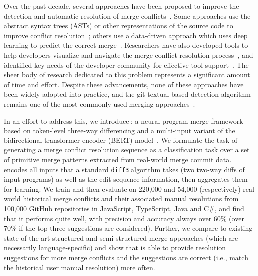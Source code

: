 Over the past decade, several approaches have been proposed to improve the detection and automatic resolution of merge conflicts~\cite{mens2002state,apel2010semistructured,lessenich2017renaming,sousa2018verified,cavalcanti2017evaluating,zhu2018conflict,kasi2013cassandra,brun2011proactive}. Some approaches use the abstract syntax trees (ASTs) or other representations of the source code to improve conflict resolution~\cite{westfechtel1991structure,apel2010semistructured, tavares2019semistructured}; others use a data-driven approach which uses deep learning to predict the correct merge~\cite{Dinella2021}. Researchers have also developed tools to help developers visualize and navigate the merge conflict resolution process~\cite{shen2019intellimerge,semanticmerge,beyondcompare}, and identified key needs of the developer community for effective tool support~\cite{nelson2019life}. The sheer body of research dedicated to this problem represents a significant amount of time and effort. Despite these advancements, none of these approaches have been widely adopted into practice, and the git textual-based detection algorithm remains one of the most commonly used merging approaches~\cite{nelson2019life}.  



In an effort to address this, we introduce \thistool{}: a neural program merge framework based on token-level three-way differencing and a multi-input variant of the bidirectional transformer encoder (BERT) model~\cite{bert}. We formulate the task of generating a merge conflict resolution sequence as a classification task over a set of primitive merge patterns extracted from real-world merge commit data. \thistool{} encodes all inputs that a standard \texttt{diff3} algorithm takes (two two-way diffs of input programs) as well as the edit sequence information, then aggregates them for learning.
We train and then evaluate \thistool{} on 220,000 and 54,000 (respectively) real world historical merge conflicts and their associated manual resolutions from 100,000 GitHub repositories in JavaScript, TypeScript, Java and C\#, and find that it performs quite well, with precision and accuracy always over 60\% (over 70\% if the top three suggestions are considered).  
Further, we compare \thistool{} to existing state of the art structured and semi-structured merge approaches (which are necessarily language-specific) and show that \thistool{} is able to provide resolution suggestions for more merge conflicts and the suggestions are correct (i.e., match the historical user manual resolution) more often.

